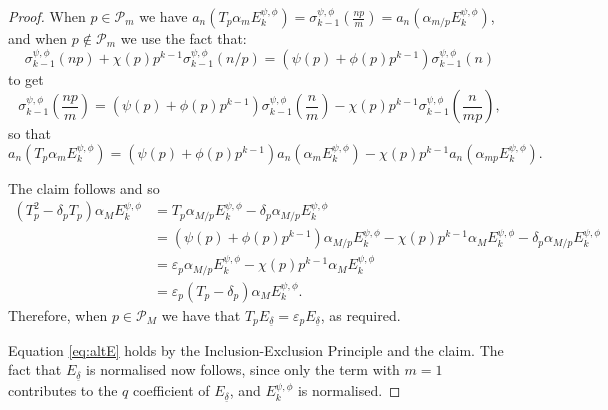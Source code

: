 \documentclass[10pt,a4paper]{amsart}
\begin{document}
\begin{proof}
\noindent When $p \in \mathcal{P}_m$ we have $a_n(T_p\alpha_m E_k^{\psi,\phi})=\sigma_{k-1}^{\psi,\phi}\left(\frac{np}{m}\right)=a_n(\alpha_{m/p}E_k^{\psi,\phi})$, and when $p\notin \mathcal{P}_m$ we use the fact that:
\begin{equation}
\label{eq:powerdiv}
    \sigma_{k-1}^{\psi,\phi}(np)+\chi(p)p^{k-1}\sigma_{k-1}^{\psi,\phi}(n/p) = (\psi(p)+\phi(p)p^{k-1})\sigma_{k-1}^{\psi,\phi}(n)
\end{equation}
to get
\begin{equation*}
    \sigma_{k-1}^{\psi,\phi}\left(\frac{np}{m}\right) = (\psi(p)+\phi(p)p^{k-1})\sigma_{k-1}^{\psi,\phi}\left(\frac{n}{m}\right)-\chi(p)p^{k-1}\sigma_{k-1}^{\psi,\phi}\left(\frac{n}{mp}\right),
\end{equation*}
so that 
\begin{equation*}
   a_n(T_p\alpha_m E_k^{\psi,\phi})=(\psi(p)+\phi(p)p^{k-1})a_n(\alpha_mE_k^{\psi,\phi})-\chi(p)p^{k-1}a_n(\alpha_{mp}E_k^{\psi,\phi}).
\end{equation*}

\noindent The claim follows and so
\begin{align*}
    (T_p^2-\delta_pT_p)\alpha_ME_k^{\psi,\phi} &= T_p\alpha_{M/p}E_k^{\psi,\phi} - \delta_p\alpha_{M/p}E_k^{\psi,\phi} \\
    &=(\psi(p)+\phi(p)p^{k-1})\alpha_{M/p}E_k^{\psi,\phi}-\chi(p)p^{k-1}\alpha_ME_k^{\psi,\phi} - \delta_p\alpha_{M/p}E_k^{\psi,\phi} \\
    &=\varepsilon_p\alpha_{M/p}E_k^{\psi,\phi} - \chi(p)p^{k-1}\alpha_ME_k^{\psi,\phi} \\
    &=\varepsilon_p(T_p-\delta_p)\alpha_M E_k^{\psi,\phi}.
\end{align*}
Therefore, when $p\in \mathcal{P}_M$ we have that $T_pE_{\underline{\delta}}=\varepsilon_pE_{\underline{\delta}}$, as required. 

Equation \eqref{eq:altE} holds by the Inclusion-Exclusion Principle and the claim. The fact that $E_{\underline{\delta}}$ is normalised now follows, since only the term with $m=1$ contributes to the $q$ coefficient of $E_{\underline{\delta}}$, and $E_k^{\psi,\phi}$ is normalised.
\end{proof}
\end{document}

